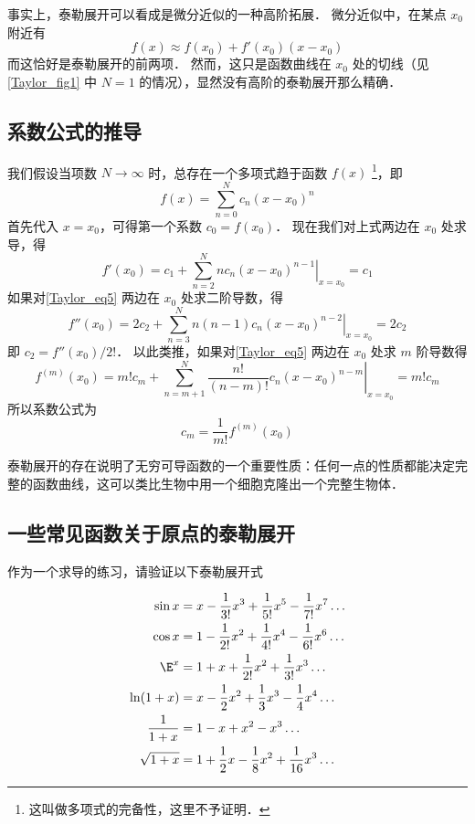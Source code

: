 事实上，泰勒展开可以看成是微分近似的一种高阶拓展． 微分近似中，在某点 $x_0$ 附近有
\begin{equation}
f(x) \approx f({x_0}) + f'({x_0})(x - {x_0})
\end{equation}
而这恰好是泰勒展开的前两项． 然而，这只是函数曲线在 $x_0$ 处的切线（见\autoref{Taylor_fig1} 中 $N=1$ 的情况），显然没有高阶的泰勒展开那么精确． 

\subsection{系数公式的推导}
我们假设当项数 $N \to \infty$ 时，总存在一个多项式趋于函数 $f(x)$ \footnote{这叫做多项式的完备性，这里不予证明．}，即
\begin{equation}\label{Taylor_eq5}
f(x) = \sum\limits_{n = 0}^N {{c_n}{{(x - {x_0})}^n}}
\end{equation}
首先代入 $x = {x_0}$，可得第一个系数 ${c_0} = f({x_0})$． 现在我们对上式两边在 $x_0$ 处求导，得
\begin{equation}
f'({x_0}) = {c_1} + \sum\limits_{n = 2}^N {{{\left. {n{c_n}{{(x - {x_0})}^{n - 1}}} \right|}_{x = {x_0}}}}  = {c_1}
\end{equation}
如果对\autoref{Taylor_eq5} 两边在 $x_0$ 处求二阶导数，得
\begin{equation}
f''({x_0}) = 2{c_2} + \sum\limits_{n = 3}^N {{{\left. {n(n - 1){c_n}{{(x - {x_0})}^{n - 2}}} \right|}_{x = {x_0}}}}  = 2{c_2}
\end{equation}
即 ${c_2} = f''({x_0})/2!$．  以此类推，如果对\autoref{Taylor_eq5} 两边在 $x_0$ 处求 $m$ 阶导数得
\begin{equation}
{f^{(m)}}({x_0}) = m!{c_m} + \sum\limits_{n = m + 1}^N {{{\left. {\frac{{n!}}{{(n - m)!}}{c_n}{{(x - {x_0})}^{n - m}}} \right|}_{x = {x_0}}}}  = m!{c_m}
\end{equation}
所以系数公式为
\begin{equation}
{c_m} = \frac{1}{{m!}}{f^{(m)}}({x_0})
\end{equation}

泰勒展开的存在说明了无穷可导函数的一个重要性质：任何一点的性质都能决定完整的函数曲线，这可以类比生物中用一个细胞克隆出一个完整生物体．

\subsection{一些常见函数关于原点的泰勒展开}
作为一个求导的练习，请验证以下泰勒展开式

\begin{align}
\sin x &= x - \frac{1}{{3!}}{x^3} + \frac{1}{{5!}}{x^5} - \frac{1}{7!}x^7 \ldots\\
\cos x &= 1 - \frac{1}{2!}{x^2} + \frac{1}{4!}{x^4} -\frac{1}{6!}x^6 \ldots\\
\E^x &=1 + x + \frac{1}{2!}x^2 + \frac{1}{3!}x^3  \ldots\\
\ln (1+x) &= x - \frac 12 x^2 + \frac 13 x^3 - \frac 14 x^4 \ldots\\
\frac{1}{1+x} &= 1 - x + x^2 - x^3 \ldots\\
\sqrt{1+x} &= 1 + \frac 12 x - \frac 18 x^2 + \frac{1}{16} x^3 \ldots
\end{align}



